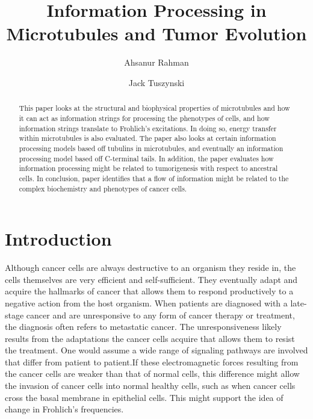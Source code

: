 \documentclass[letterpaper,final,times]{cas-dc}
\numberwithin{equation}{section}
\begin{document}
\let\WriteBookmarks\relax
\def\floatpagepagefraction{1}
\def\textpagefraction{.001}

\title[mode=title]{\textbf{Information Processing in Microtubules and Tumor Evolution}}
\author[1]{Ahsanur Rahman}
\cormark[1]
\address[1]{Department of Mathematics and Statistical Sciences, University of Alberta}

\author[2]{Jack Tuszynski}
\address[2]{Department of Physics, University of Alberta}


\maketitle
\tableofcontents
\begin{abstract}
This paper looks at the structural and biophysical properties of microtubules and how it can act as information strings for processing the phenotypes of cells, and how information strings translate to Frohlich’s excitations. In doing so, energy transfer within microtubules is also evaluated. The paper also looks at certain information processing models based off tubulins in microtubules, and eventually an information processing model based off C-terminal tails. In addition, the paper evaluates how information processing might be related to tumorigenesis with respect to ancestral cells. In conclusion, paper identifies that a flow of information might be related to the complex biochemistry and phenotypes of cancer cells.
\end{abstract}

\section{Introduction}\noindent
Although cancer cells are always destructive to an organism they reside in, the cells themselves are very efficient and self-sufficient. They eventually adapt and acquire the hallmarks of cancer that allows them to respond productively to a negative action from the host organism. When patients are diagnosed with a late-stage cancer and are unresponsive to any form of cancer therapy or treatment, the diagnosis often refers to metastatic cancer. The unresponsiveness likely results from the adaptations the cancer cells acquire that allows them to resist the treatment. One would assume a wide range of signaling pathways are involved that differ from patient to patient.If these electromagnetic forces resulting from the cancer cells are weaker than that of normal cells, this difference might allow the invasion of cancer cells into normal healthy cells\citep{pokorny2009}, such as when cancer cells cross the basal membrane in epithelial cells. This might support the idea of change in Frohlich’s frequencies.
\end{document}

